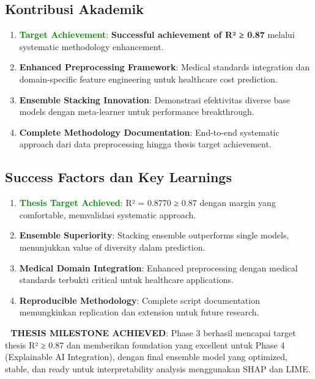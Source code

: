 \subsection{Kontribusi Akademik}
\begin{enumerate}
    \item \textbf{\textcolor{green}{Target Achievement}}: \textbf{Successful achievement of R² ≥ 0.87} melalui systematic methodology enhancement.

    \item \textbf{Enhanced Preprocessing Framework}: Medical standards integration dan domain-specific feature engineering untuk healthcare cost prediction.

    \item \textbf{Ensemble Stacking Innovation}: Demonstrasi efektivitas diverse base models dengan meta-learner untuk performance breakthrough.

    \item \textbf{Complete Methodology Documentation}: End-to-end systematic approach dari data preprocessing hingga thesis target achievement.
\end{enumerate}

\subsection{Success Factors dan Key Learnings}
\begin{enumerate}
    \item \textbf{\textcolor{green}{Thesis Target Achieved}}: R² = 0.8770 ≥ 0.87 dengan margin yang comfortable, memvalidasi systematic approach.

    \item \textbf{Ensemble Superiority}: Stacking ensemble outperforms single models, menunjukkan value of diversity dalam prediction.

    \item \textbf{Medical Domain Integration}: Enhanced preprocessing dengan medical standards terbukti critical untuk healthcare applications.

    \item \textbf{Reproducible Methodology}: Complete script documentation memungkinkan replication dan extension untuk future research.
\end{enumerate}

\textbf{🎯 THESIS MILESTONE ACHIEVED}: Phase 3 berhasil mencapai target thesis R² ≥ 0.87 dan memberikan foundation yang excellent untuk Phase 4 (Explainable AI Integration), dengan final ensemble model yang optimized, stable, dan ready untuk interpretability analysis menggunakan SHAP dan LIME.

